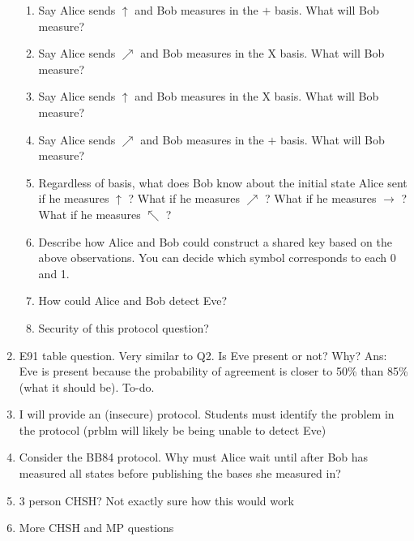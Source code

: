 \documentclass[12pt]{article}
\begin{document}
\begin{enumerate}[font=\bfseries]
        \begin{enumerate}
            \item Say Alice sends $\uparrow$ and Bob measures in the $+$ basis. What will Bob measure?
            \item Say Alice sends $\nearrow$ and Bob measures in the X basis. What will Bob measure?
            \item Say Alice sends $\uparrow$ and Bob measures in the X basis. What will Bob measure?
            \item Say Alice sends $\nearrow$ and Bob measures in the $+$ basis. What will Bob measure?
            \item Regardless of basis, what does Bob know about the initial state Alice sent if he measures $\uparrow$ ? What if he measures $\nearrow$ ? What if he measures  $\rightarrow$ ? What if he measures $\nwarrow$ ?
            \item Describe how Alice and Bob could construct a shared key based on the above observations. You can decide which symbol corresponds to each 0 and 1. 
            \item How could Alice and Bob detect Eve?
            \item Security of this protocol question?
        \end{enumerate}
    \item E91 table question. Very similar to Q2. Is Eve present or not? Why? Ans: Eve is present because the probability of agreement is closer to 50\% than 85\% (what it should be). To-do.
    \item I will provide an (insecure) protocol. Students must identify the problem in the protocol (prblm will likely be being unable to detect Eve)
    \item Consider the BB84 protocol. Why must Alice wait until after Bob has measured all states before publishing the bases she measured in?
    \item 3 person CHSH? Not exactly sure how this would work
    \item More CHSH and MP questions
\end{enumerate}
\end{document}
